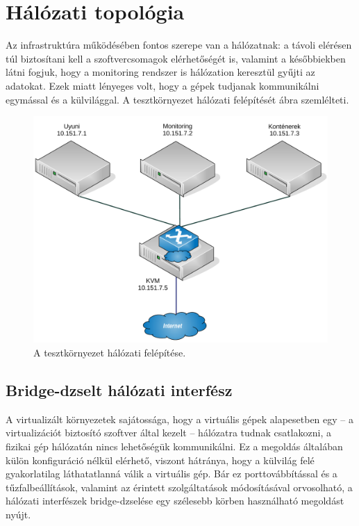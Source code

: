 \section{Hálózati topológia}
Az infrastruktúra működésében fontos szerepe van a hálózatnak: a távoli elérésen túl biztosítani kell a szoftvercsomagok elérhetőségét is, valamint a későbbiekben látni fogjuk, hogy a monitoring rendszer is hálózation keresztül gyűjti az adatokat. Ezek miatt lényeges volt, hogy a gépek tudjanak kommunikálni egymással és a külvilággal. A tesztkörnyezet hálózati felépítését  ábra szemlélteti.

\begin{figure}[ht]
	\centering
	\includegraphics[width=15cm]{figures/halozat.pdf}
	\caption{A tesztkörnyezet hálózati felépítése.}
	\label{fig:test-env-network}
\end{figure}

\subsection{Bridge-dzselt hálózati interfész}
\label{sect:net-bridge}
A virtualizált környezetek sajátossága, hogy a virtuális gépek alapesetben egy -- a virtualizációt biztosító szoftver által kezelt -- hálózatra tudnak csatlakozni, a fizikai gép hálózatán nincs lehetőségük kommunikálni. Ez a megoldás általában külön konfiguráció nélkül elérhető, viszont hátránya, hogy a külvilág felé gyakorlatilag láthatatlanná válik a virtuális gép. Bár ez porttovábbítással és a tűzfalbeállítások, valamint az érintett szolgáltatások módosításával orvosolható, a hálózati interfészek bridge-dzselése egy szélesebb körben használható megoldást nyújt.

